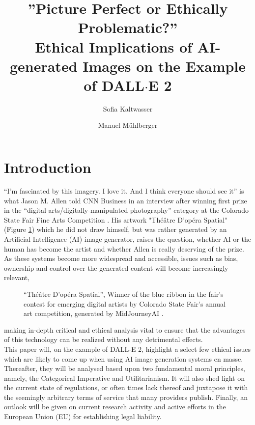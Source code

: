 \documentclass[10pt,twocolumn,twoside]{osajnl}
\title{”Picture Perfect or Ethically Problematic?” \\ Ethical Implications of AI-generated Images on the Example of DALL$\cdot$E 2}
\author[1]{Sofia Kaltwasser}
\author[2]{Manuel Mühlberger}
\affil[1]{University of Potsdam}
\affil[2]{School of Computation, Information and Technology, TU Munich}
\begin{document}
\onehalfspacing

\maketitle

\section{Introduction}
“I’m fascinated by this imagery. I love it. And I think everyone should see it” is what Jason M. Allen told CNN Business in an interview after winning first prize in the “digital arts/digitally-manipulated photography” category at the Colorado State Fair Fine Arts Competition \cite{JasonMAllenCNN}.
His artwork "Théâtre D’opéra Spatial" (Figure \ref{Theatre}) which he did not draw himself, but was rather generated by an Artificial Intelligence (AI) image generator, raises the question, whether AI or the human has become the artist and whether Allen is really deserving of the prize.
As these systems become more widespread and accessible, issues such as bias, ownership and control over the generated content will become increasingly relevant, 
\begin{figure}[H]
	\centering
	\caption{“Théâtre D’opéra Spatial”, Winner of the blue ribbon in the fair’s contest for emerging digital artists by Colorado State Fair’s annual art competition, generated by MidJourneyAI \cite{OperaSpecial}.}
	\label{Theatre}
\end{figure}
\noindent
making in-depth critical and ethical analysis vital to ensure that the advantages of this technology can be realized without any detrimental effects. 
\\
This paper will, on the example of DALL-E 2, highlight a select few ethical issues which are likely to come up when using AI image generation systems en masse. 
Thereafter, they will be analysed based upon two fundamental moral principles, namely, the Categorical Imperative and Utilitarianism. 
It will also shed light on the current state of regulations, or often times lack thereof and juxtapose it with the seemingly arbitrary terms of service that many providers publish. 
Finally, an outlook will be given on current research activity and active efforts in the European Union (EU) for establishing legal liability. 
\end{document}
